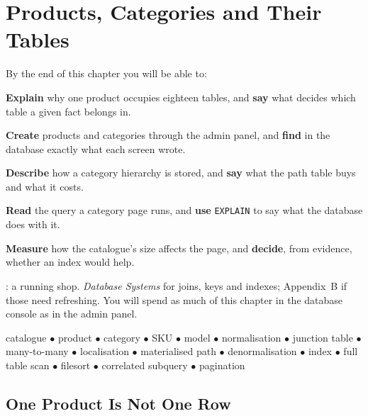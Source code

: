 \chapter{Products, Categories and Their Tables}\label{ch:catalogue}

\begin{outcomes}
By the end of this chapter you will be able to:
\begin{tight}
  \item \textbf{Explain} why one product occupies eighteen tables, and
        \textbf{say} what decides which table a given fact belongs in.
  \item \textbf{Create} products and categories through the admin panel, and
        \textbf{find} in the database exactly what each screen wrote.
  \item \textbf{Describe} how a category hierarchy is stored, and \textbf{say}
        what the path table buys and what it costs.
  \item \textbf{Read} the query a category page runs, and \textbf{use}
        \texttt{EXPLAIN} to say what the database does with it.
  \item \textbf{Measure} how the catalogue's size affects the page, and
        \textbf{decide}, from evidence, whether an index would help.
\end{tight}
\end{outcomes}

\begin{prereq}
: a running shop. \emph{Database Systems} for joins, keys and
indexes; Appendix~B if those need refreshing. You will spend as much of this
chapter in the database console as in the admin panel.
\end{prereq}

\begin{keyterms}
catalogue $\bullet$ product $\bullet$ category $\bullet$ SKU $\bullet$ model
$\bullet$ normalisation $\bullet$ junction table $\bullet$ many-to-many
$\bullet$ localisation $\bullet$ materialised path $\bullet$ denormalisation
$\bullet$ index $\bullet$ full table scan $\bullet$ filesort $\bullet$
correlated subquery $\bullet$ pagination
\end{keyterms}

\section{One Product Is Not One Row}

